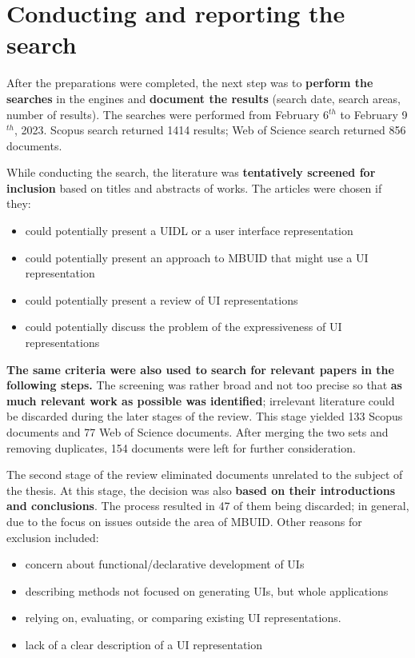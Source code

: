 \section{Conducting and reporting the search}\label{sec:conducting-and-reporting-the-search}


After the preparations were completed, the next step was to \textbf{perform the searches} in the engines and \textbf{document the results} (search date, search areas, number of results).
The searches were performed from February 6$^{th}$ to February 9$^{th}$, 2023.
Scopus search returned 1414 results;
Web of Science search returned 856 documents.

While conducting the search, the literature was \textbf{tentatively screened for inclusion} based on titles and abstracts of works.
The articles were chosen if they:
\begin{itemize}
    \item could potentially present a UIDL or a user interface representation
    \item could potentially present an approach to MBUID that might use a UI representation
    \item could potentially present a review of UI representations
    \item could potentially discuss the problem of the expressiveness of UI representations
\end{itemize}
\textbf{The same criteria were also used to search for relevant papers in the following steps.}
The screening was rather broad and not too precise so that \textbf{as much relevant work as possible was identified};
irrelevant literature could be discarded during the later stages of the review.
This stage yielded 133 Scopus documents and 77 Web of Science documents.
After merging the two sets and removing duplicates, 154 documents were left for further consideration.

The second stage of the review eliminated documents unrelated to the subject of the thesis.
At this stage, the decision was also \textbf{based on their introductions and conclusions}.
The process resulted in 47 of them being discarded; in general, due to the focus on issues outside the area of MBUID\@.
Other reasons for exclusion included:
\begin{itemize}
    \item concern about functional/declarative development of UIs
    \item describing methods not focused on generating UIs, but whole applications
    \item relying on, evaluating, or comparing existing UI representations.
    \item lack of a clear description of a UI representation
\end{itemize}

